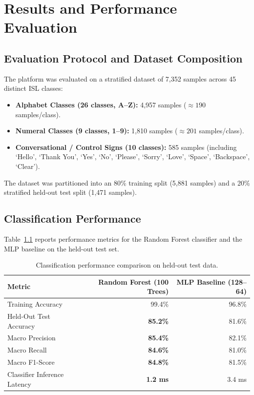 
\chapter{Results and Performance Evaluation}
\label{Chapter5}

\section{Evaluation Protocol and Dataset Composition}
The platform was evaluated on a stratified dataset of 7,352 samples across 45 distinct ISL classes:
\begin{itemize}
\item \textbf{Alphabet Classes (26 classes, A--Z):} 4,957 samples ($\approx 190$ samples/class).
\item \textbf{Numeral Classes (9 classes, 1--9):} 1,810 samples ($\approx 201$ samples/class).
\item \textbf{Conversational / Control Signs (10 classes):} 585 samples (including `Hello', `Thank You', `Yes', `No', `Please', `Sorry', `Love', `Space', `Backspace', `Clear').
\end{itemize}
The dataset was partitioned into an 80\% training split (5,881 samples) and a 20\% stratified held-out test split (1,471 samples).

\section{Classification Performance}
Table~\ref{tab:model-results} reports performance metrics for the Random Forest classifier and the MLP baseline on the held-out test set.

\begin{table}[htbp]\centering
\caption{Classification performance comparison on held-out test data.}\label{tab:model-results}
\begin{tabular}{lrr}\toprule
Metric & Random Forest (100 Trees) & MLP Baseline (128--64)\\\midrule
Training Accuracy & 99.4\% & 96.8\%\\
Held-Out Test Accuracy & \textbf{85.2\%} & 81.6\%\\
Macro Precision & \textbf{85.4\%} & 82.1\%\\
Macro Recall & \textbf{84.6\%} & 81.0\%\\
Macro F1-Score & \textbf{84.8\%} & 81.5\%\\
Classifier Inference Latency & \textbf{1.2 ms} & 3.4 ms\\\bottomrule
\end{tabular}\end{table}

